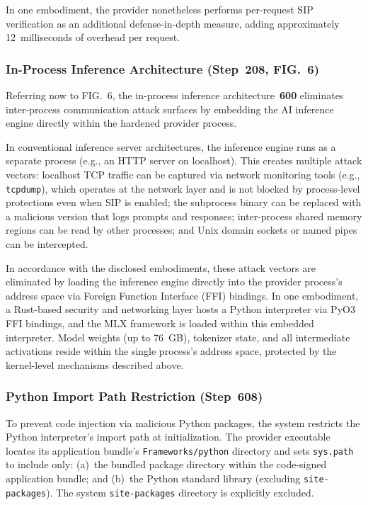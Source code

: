 \documentclass[11pt,letterpaper]{article}
\begin{document}
In one embodiment, the provider nonetheless performs per-request SIP verification as an additional defense-in-depth measure, adding approximately 12~milliseconds of overhead per request.

\subsubsection{In-Process Inference Architecture (Step~208, FIG.~6)}

Referring now to FIG.~6, the in-process inference architecture~\textbf{600} eliminates inter-process communication attack surfaces by embedding the AI inference engine directly within the hardened provider process.

In conventional inference server architectures, the inference engine runs as a separate process (e.g., an HTTP server on localhost). This creates multiple attack vectors: localhost TCP traffic can be captured via network monitoring tools (e.g., \texttt{tcpdump}), which operates at the network layer and is not blocked by process-level protections even when SIP is enabled; the subprocess binary can be replaced with a malicious version that logs prompts and responses; inter-process shared memory regions can be read by other processes; and Unix domain sockets or named pipes can be intercepted.

In accordance with the disclosed embodiments, these attack vectors are eliminated by loading the inference engine directly into the provider process's address space via Foreign Function Interface (FFI) bindings. In one embodiment, a Rust-based security and networking layer hosts a Python interpreter via PyO3 FFI bindings, and the MLX framework is loaded within this embedded interpreter. Model weights (up to 76~GB), tokenizer state, and all intermediate activations reside within the single process's address space, protected by the kernel-level mechanisms described above.

\subsubsection{Python Import Path Restriction (Step~608)}

To prevent code injection via malicious Python packages, the system restricts the Python interpreter's import path at initialization. The provider executable locates its application bundle's \texttt{Frameworks/python} directory and sets \texttt{sys.path} to include only: (a)~the bundled package directory within the code-signed application bundle; and (b)~the Python standard library (excluding \texttt{site-packages}). The system \texttt{site-packages} directory is explicitly excluded.
\end{document}
